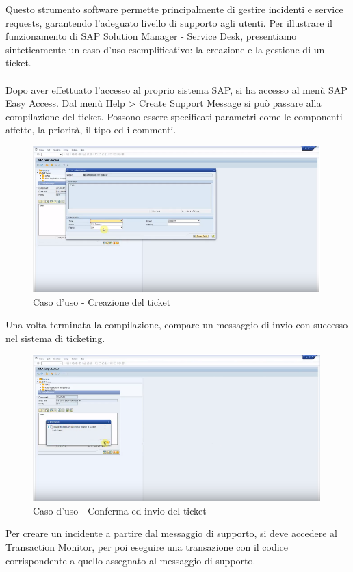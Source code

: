 Questo strumento software permette principalmente di gestire incidenti e service requests, garantendo l'adeguato livello di supporto agli utenti. Per illustrare il funzionamento di SAP Solution Manager - Service Desk, presentiamo sinteticamente un caso d'uso esemplificativo: la creazione e la gestione di un ticket.
\\ \\
Dopo aver effettuato l'accesso al proprio sistema SAP, si ha accesso al menù SAP Easy Access. Dal menù Help > Create Support Message si può passare alla compilazione del ticket. Possono essere specificati parametri come le componenti affette, la priorità, il tipo ed i commenti.

\begin{figure}[H]
\centering
\includegraphics[width=30em]{immagini/sla/sd1.png}
\caption{Caso d'uso - Creazione del ticket}
\end{figure}

Una volta terminata la compilazione, compare un messaggio di invio con successo nel sistema di ticketing.

\begin{figure}[H]
\centering
\includegraphics[width=30em]{immagini/sla/sd2.png}
\caption{Caso d'uso - Conferma ed invio del ticket}
\end{figure}

Per creare un incidente a partire dal messaggio di supporto, si deve accedere al Transaction Monitor, per poi eseguire una transazione con il codice corrispondente a quello assegnato al messaggio di supporto.

